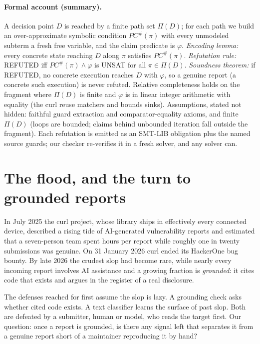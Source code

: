 \documentclass[11pt]{article}
\begin{document}
\paragraph{Formal account (summary).} A decision point $D$ is reached by a finite path set $\Pi(D)$; for each path
we build an over-approximate symbolic condition $PC^\#(\pi)$ with every unmodeled subterm a fresh free variable, and
the claim predicate is $\varphi$. \emph{Encoding lemma:} every concrete state reaching $D$ along $\pi$ satisfies
$PC^\#(\pi)$. \emph{Refutation rule:} REFUTED iff $PC^\#(\pi)\wedge\varphi$ is UNSAT for all $\pi\in\Pi(D)$.
\emph{Soundness theorem:} if REFUTED, no concrete execution reaches $D$ with $\varphi$, so a genuine report (a
concrete such execution) is never refuted. Relative completeness holds on the fragment where $\Pi(D)$ is finite and
$\varphi$ is in linear integer arithmetic with equality (the curl reuse matchers and bounds sinks). Assumptions,
stated not hidden: faithful guard extraction and comparator-equality axioms, and finite $\Pi(D)$ (loops are bounded;
claims behind unbounded iteration fall outside the fragment). Each refutation is emitted as an SMT-LIB obligation
plus the named source guards; our checker re-verifies it in a fresh solver, and any solver can.

\section{The flood, and the turn to grounded reports}
In July 2025 the curl project, whose library ships in effectively every connected device, described a rising tide
of AI-generated vulnerability reports and estimated that a seven-person team spent hours per report while roughly
one in twenty submissions was genuine. On 31 January 2026 curl ended its HackerOne bug bounty. By late 2026 the
crudest slop had become rare, while nearly every incoming report involves AI assistance and a growing fraction is
\emph{grounded}: it cites code that exists and argues in the register of a real disclosure.

The defenses reached for first assume the slop is lazy. A grounding check asks whether cited code exists. A text
classifier learns the surface of past slop. Both are defeated by a submitter, human or model, who reads the target
first. Our question: once a report is grounded, is there any signal left that separates it from a genuine report
short of a maintainer reproducing it by hand?
\end{document}
